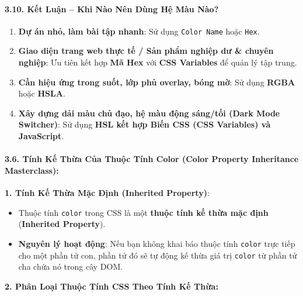 \documentclass[11pt,oneside]{book}
\newcommand{\codeinline}[1]{\textcolor{accentOrange}{\texttt{#1}}}
\newcommand{\term}[1]{\textbf{\textcolor{primaryBlue}{#1}}}
\begin{document}
\paragraph{3.10. Kết Luận – Khi Nào Nên Dùng Hệ Màu Nào?}

\begin{conceptBox}
\begin{enumerate}[leftmargin=1.5em, itemsep=4pt, parsep=0pt]
    \item \textbf{Dự án nhỏ, làm bài tập nhanh}: Sử dụng \codeinline{Color Name} hoặc \codeinline{Hex}.
    \item \textbf{Giao diện trang web thực tế / Sản phẩm nghiệp dư \& chuyên nghiệp}: Ưu tiên kết hợp \textbf{Mã Hex} với \textbf{CSS Variables} để quản lý tập trung.
    \item \textbf{Cần hiệu ứng trong suốt, lớp phủ overlay, bóng mờ}: Sử dụng \textbf{RGBA} hoặc \textbf{HSLA}.
    \item \textbf{Xây dựng dải màu chủ đạo, hệ màu động sáng/tối (\term{Dark Mode Switcher})}: Sử dụng \textbf{HSL kết hợp Biến CSS (\term{CSS Variables}) và JavaScript}.
\end{enumerate}
\end{conceptBox}

\paragraph{3.6. Tính Kế Thừa Của Thuộc Tính Color (Color Property Inheritance Masterclass):}

\begin{conceptBox}
\textbf{1. Tính Kế Thừa Mặc Định (Inherited Property)}:
\begin{itemize}[leftmargin=1.5em, itemsep=3pt, parsep=0pt]
    \item Thuộc tính \codeinline{color} trong CSS là một \term{thuộc tính kế thừa mặc định} (\term{Inherited Property}).
    \item \textbf{Nguyên lý hoạt động}: Nếu bạn không khai báo thuộc tính \codeinline{color} trực tiếp cho một phần tử con, phần tử đó sẽ tự động kế thừa giá trị \codeinline{color} từ phần tử cha chứa nó trong cây DOM.
\end{itemize}
\end{conceptBox}

\textbf{2. Phân Loại Thuộc Tính CSS Theo Tính Kế Thừa:}
\end{document}
